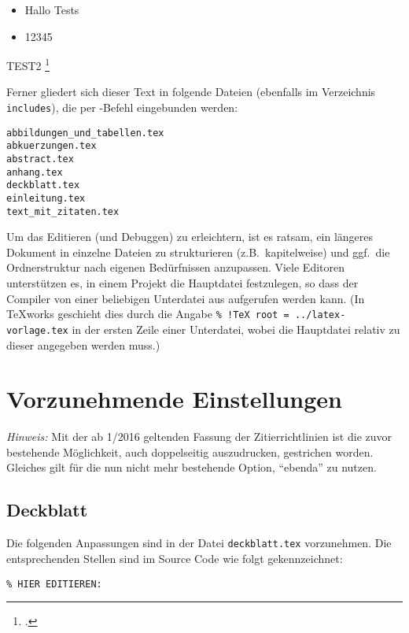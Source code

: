 \begin{itemize}
    \item  Hallo Tests
    \item  12345
\end{itemize}

TEST2
\footcite[Vgl.][S. 15 f.]{sarkerMachineLearningAlgorithms2021}



Ferner gliedert sich dieser Text in folgende Dateien (ebenfalls im Verzeichnis \verb|includes|), die per \verb||-Befehl eingebunden werden:
\begin{verbatim}
abbildungen_und_tabellen.tex
abkuerzungen.tex
abstract.tex
anhang.tex
deckblatt.tex
einleitung.tex
text_mit_zitaten.tex
\end{verbatim}

Um das Editieren (und Debuggen) zu erleichtern, ist es ratsam, ein längeres Dokument in einzelne Dateien zu strukturieren (z.B.\ kapitelweise) und ggf.\ die Ordnerstruktur nach eigenen Bedürfnissen anzupassen. Viele Editoren unterstützen es, in einem Projekt die Hauptdatei festzulegen, so dass der Compiler von einer beliebigen Unterdatei aus aufgerufen werden kann. (In TeXworks geschieht dies durch die Angabe \verb|% !TeX root = ../latex-vorlage.tex| in der ersten Zeile einer Unterdatei, wobei die Hauptdatei relativ zu dieser angegeben werden muss.)

\section{Vorzunehmende Einstellungen}

\emph{Hinweis:} Mit der ab 1/2016 geltenden Fassung der Zitierrichtlinien ist die zuvor bestehende Möglichkeit, auch doppelseitig auszudrucken, gestrichen worden. Gleiches gilt für die nun nicht mehr bestehende Option, \enquote{ebenda} zu nutzen.

\subsection{Deckblatt}

Die folgenden Anpassungen sind in der Datei \verb|deckblatt.tex| vorzunehmen. Die entsprechenden Stellen sind im Source Code wie folgt gekennzeichnet:
\lstset{language=TeX} 
\begin{lstlisting}
% HIER EDITIEREN: 
\end{lstlisting}

